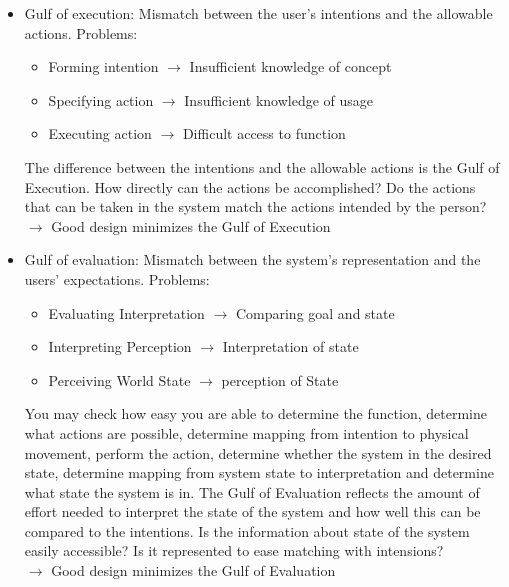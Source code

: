 \begin{itemize}
\item Gulf of execution: Mismatch between the user's intentions and the allowable actions. Problems:
\begin{itemize}
\item Forming intention $\rightarrow$ Insufficient knowledge of concept
\item Specifying action $\rightarrow$ Insufficient knowledge of usage
\item Executing action $\rightarrow$ Difficult access to function
\end{itemize}
The difference between the intentions and the allowable actions is the Gulf of Execution. How directly can the actions be accomplished? Do the actions that can be taken in the system match the actions intended by the person?\\
$\rightarrow$ Good design minimizes the Gulf of Execution
\item Gulf of evaluation: Mismatch between the system's representation and the users' expectations. Problems:
\begin{itemize}
\item Evaluating Interpretation $\rightarrow$  Comparing goal and state
\item Interpreting Perception $\rightarrow$ Interpretation of state
\item Perceiving World State $\rightarrow$ perception of State
\end{itemize}
You may check how easy you are able to determine the function, determine what actions are possible, determine mapping from intention to physical movement, perform the action, determine whether the system in the desired state, determine mapping from system state to interpretation and determine what state the system is in. The Gulf of Evaluation reflects the amount of effort needed to interpret the state of the system and how well this can be compared to the intentions. Is the information about state of the system easily accessible? Is it represented to ease matching with intensions?\\
$\rightarrow$ Good design minimizes the Gulf of Evaluation
\end{itemize}

